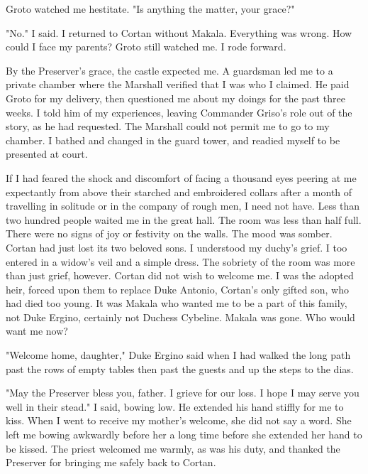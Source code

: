 \documentclass{article}
\begin{document}
Groto watched me hestitate. "Is anything the matter, your grace?"

"No." I said. I returned to Cortan without Makala. Everything was wrong. How could I face my parents? Groto still watched me. I rode forward.

By the Preserver's grace, the castle expected me. A guardsman led me to a private chamber where the Marshall verified that I was who I claimed. He paid Groto for my delivery, then questioned me about my doings for the past three weeks. I told him of my experiences, leaving Commander Griso's role out of the story, as he had requested. The Marshall could not permit me to go to my chamber. I bathed and changed in the guard tower, and readied myself to be presented at court. 

If I had feared the shock and discomfort of facing a thousand eyes peering at me expectantly from above their starched and embroidered collars after a month of travelling in solitude or in the company of rough men, I need not have. Less than two hundred people waited me in the great hall. The room was less than half full. There were no signs of joy or festivity on the walls. The mood was somber. Cortan had just lost its two beloved sons. I understood my duchy's grief. I too entered in a widow's veil and a simple dress. The sobriety of the room was more than just grief, however. Cortan did not wish to welcome me. I was the adopted heir, forced upon them to replace Duke Antonio, Cortan's only gifted son, who had died too young. It was Makala who wanted me to be a part of this family, not Duke Ergino, certainly not Duchess Cybeline. Makala was gone. Who would want me now?

"Welcome home, daughter," Duke Ergino said when I had walked the long path past the rows of empty tables then past the guests and up the steps to the dias. 

"May the Preserver bless you, father. I grieve for our loss. I hope I may serve you well in their stead." I said, bowing low. He extended his hand stiffly for me to kiss. When I went to receive my mother's welcome, she did not say a word. She left me bowing awkwardly before her a long time before she extended her hand to be kissed. The priest welcomed me warmly, as was his duty, and thanked the Preserver for bringing me safely back to Cortan. 
\end{document}
